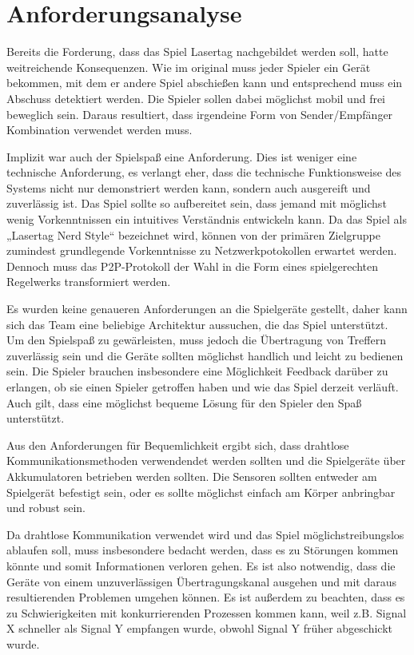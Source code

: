 \section{Anforderungsanalyse}

Bereits die Forderung, dass das Spiel Lasertag nachgebildet werden soll, hatte weitreichende
Konsequenzen.
Wie im original muss jeder Spieler ein Gerät bekommen, mit dem er andere Spiel abschießen kann und
entsprechend muss ein Abschuss detektiert werden.
Die Spieler sollen dabei möglichst mobil und frei beweglich sein.
Daraus resultiert, dass irgendeine Form von Sender/Empfänger Kombination verwendet werden muss.

Implizit war auch der Spielspaß eine Anforderung.
Dies ist weniger eine technische Anforderung, es verlangt eher, dass die technische Funktionsweise
des Systems nicht nur demonstriert werden kann, sondern auch ausgereift und zuverlässig ist.
Das Spiel sollte so aufbereitet sein, dass jemand mit möglichst wenig Vorkenntnissen ein intuitives
Verständnis entwickeln kann.
Da das Spiel als „Lasertag Nerd Style“ bezeichnet wird, können von der primären Zielgruppe zumindest
grundlegende Vorkenntnisse zu Netzwerkpotokollen erwartet werden. Dennoch muss das P2P-Protokoll der
Wahl in die Form eines spielgerechten Regelwerks transformiert werden.

Es wurden keine genaueren Anforderungen an die Spielgeräte gestellt, daher kann sich das Team eine
beliebige Architektur aussuchen, die das Spiel unterstützt.
Um den Spielspaß zu gewärleisten, muss jedoch die Übertragung von Treffern zuverlässig sein und die
Geräte sollten möglichst handlich und leicht zu bedienen sein.
Die Spieler brauchen insbesondere eine Möglichkeit Feedback darüber zu erlangen, ob sie einen
Spieler getroffen haben und wie das Spiel derzeit verläuft. Auch gilt, dass eine möglichst bequeme
Lösung für den Spieler den Spaß unterstützt.

Aus den Anforderungen für Bequemlichkeit ergibt sich, dass drahtlose Kommunikationsmethoden
verwendendet werden sollten und die Spielgeräte über Akkumulatoren betrieben werden sollten.
Die Sensoren sollten entweder am Spielgerät befestigt sein, oder es sollte möglichst einfach am
Körper anbringbar und robust sein.

Da drahtlose Kommunikation verwendet wird und das Spiel möglichstreibungslos ablaufen soll, muss
insbesondere bedacht werden, dass es zu Störungen kommen könnte und somit Informationen verloren
gehen.
Es ist also notwendig, dass die Geräte von einem unzuverlässigen Übertragungskanal ausgehen und mit
daraus resultierenden Problemen umgehen können.
Es ist außerdem zu beachten, dass es zu Schwierigkeiten mit konkurrierenden Prozessen kommen kann,
weil z.B. Signal X schneller als Signal Y empfangen wurde, obwohl Signal Y früher abgeschickt wurde.
